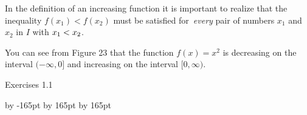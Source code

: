 \documentclass{sebase}
\begin{document}
In the definition of an increasing function it is important to realize that
the inequality $f(x_{1})<f(x_{2})$ must be satisfied for\textit{\ every}
pair of numbers $x_{1}$ and $x_{2}$ in $I$ with $x_{1}\nolinebreak
<\nolinebreak x_{2}$.

You can see from Figure 23 that the function $f(x)=x^{2}$ is decreasing on
the interval $(-\infty ,0]$ and increasing on the interval $[0,\infty )$.

Exercises 1.1

\setlength{\columnsep}{24pt}
\advance \leftskip by -165pt
\advance\hsize by 165pt
\advance\linewidth by 165pt
\end{document}
